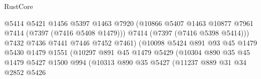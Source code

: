 \begin{lexlean}{RustCore}
\begin{coremodule}
                                          @5414
                                          @5421
                                          @1456
                                          @5397
                                          @1463
                                          @7920
                                          (@10866
                                            @5407
                                            @1463
                                            @10877
                                            @7961
                                            @7414
                                            (@7397 (@7416 @5408 @1479)))
                                          @7414
                                          (@7397 (@7416 @5398 @5414)))
                                        @7432
                                        @7436
                                        @7441
                                        @7446
                                        @7452
                                        @7461)
                                      (@10098
                                        @5424
                                        @891
                                        @93
                                        @45
                                        @1479
                                        @5430
                                        @1479
                                        @1551
                                        (@10297
                                          @891
                                          @45
                                          @1479
                                          @5429
                                          (@10304
                                            @890
                                            @35
                                            @45
                                            @1479
                                            @5427
                                            @1500
                                            @994
                                            (@10313
                                              @890
                                              @35
                                              @5427
                                              (@11237
                                                @889
                                                @31
                                                @34
                                                @2852
                                                @5426

\end{coremodule}
\end{lexlean}
